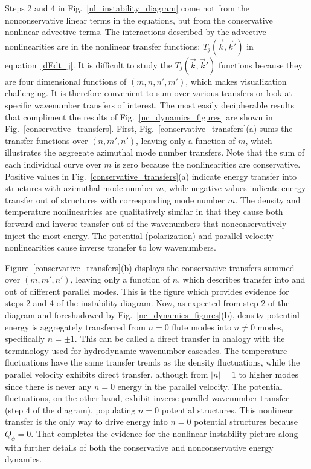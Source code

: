 \documentclass[showpacs,preprintnumbers,amsmath,amssymb,superscriptaddress]{revtex4}
\begin{document}
Steps 2 and 4 in Fig.~\ref{nl_instability_diagram} come not from the nonconservative linear terms in the equations, but from the conservative nonlinear advective terms.
The interactions described by the advective nonlinearities are in the nonlinear transfer functions: $T_{j}(\vec{k},\vec{k}')$ in equation~\ref{dEdt_j}.
It is difficult to study the $T_{j}(\vec{k},\vec{k}')$ functions because they are four dimensional functions of $(m,n,n',m')$, 
which makes visualization challenging. It is therefore convenient to sum over various transfers or look at specific wavenumber transfers of interest. The most easily decipherable
results that compliment the results of Fig.~\ref{nc_dynamics_figures} are shown in Fig.~\ref{conservative_transfers}. First, Fig.~\ref{conservative_transfers}(a) sums the transfer functions over
$(n,m',n')$, leaving only a function of $m$, which illustrates the aggregate azimuthal mode
number transfers. Note that the sum of each individual curve over $m$ is zero because the nonlinearities are conservative. Positive values in Fig.~\ref{conservative_transfers}(a)
indicate energy transfer into structures with azimuthal mode number $m$, while negative values indicate energy transfer out of structures with corresponding mode number $m$. 
The density and temperature nonlinearities
are qualitatively similar in that they cause both forward and inverse transfer out of the wavenumbers that nonconservatively inject the most energy. The potential (polarization) and parallel velocity 
nonlinearities cause inverse transfer to low wavenumbers. 

Figure~\ref{conservative_transfers}(b) displays the conservative transfers summed over $(m,m',n')$, leaving only a function of $n$, which describes transfer into and out
of different parallel modes. This is the figure which provides evidence for steps 2 and 4 of the instability diagram.
Now, as expected from step 2 of the diagram and foreshadowed by Fig.~\ref{nc_dynamics_figures}(b), 
density potential energy is aggregately transferred from $n=0$ flute modes into $n \ne 0$ modes, specifically $n = \pm 1$. This can be called a direct
transfer in analogy with the terminology used for hydrodynamic wavenumber cascades. The temperature fluctuations have the same transfer trends 
as the density fluctuations, while the parallel velocity exhibits direct transfer, although from $|n|=1$ to higher modes since there is never any $n=0$ energy in the parallel velocity.
The potential fluctuations, on the other hand, exhibit inverse parallel wavenumber transfer (step 4 of the diagram),
populating $n=0$ potential structures. This nonlinear transfer is the only way to drive energy into
$n=0$ potential structures because $Q_\phi=0$. That completes the evidence for the nonlinear instability picture along with further details of both the conservative and nonconservative energy dynamics.
\end{document}
